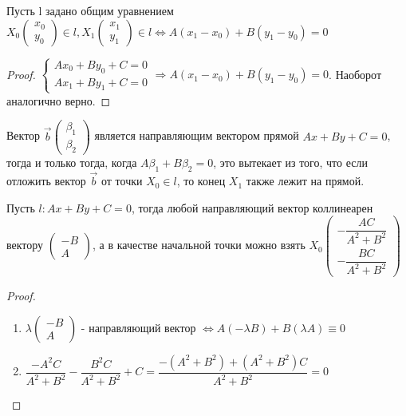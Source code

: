 \begin{proposition}
	Пусть l задано общим уравнением \(X_0\begin{pmatrix}
		x_0 \\ y_0
	\end{pmatrix} \in l, X_1\begin{pmatrix}
	x_1 \\ y_1
	\end{pmatrix} \in l\Longleftrightarrow A(x_1-x_0) + B(y_1-y_0) = 0\)
\end{proposition}
\begin{proof}
	\(\left\{
	\begin{gathered}
		Ax_0 + By_0+C = 0 \\
		Ax_1 + By_1 + C = 0
	\end{gathered}
	\right. \Longrightarrow A(x_1 - x_0) + B(y_1 - y_0 ) = 0\). Наоборот аналогично верно.
\end{proof}
\begin{corollary}
	Вектор \(\vec b\begin{pmatrix}
		\beta_1 \\ \beta_2
	\end{pmatrix}\) является направляющим вектором прямой \(Ax + By + C = 0\), тогда и только тогда, когда \(A\beta_1+B\beta_2 = 0\), это вытекает из того, что если отложить вектор $\vec{b}$ от точки \(X_0 \in l\), то конец \(X_1\) также лежит на прямой.
\end{corollary}
\begin{theorem}
	Пусть \(l: Ax+By+C = 0\), тогда любой направляющий вектор коллинеарен вектору \(\begin{pmatrix}
		-B \\ A
	\end{pmatrix}\), а в качестве начальной точки можно взять \(X_0\begin{pmatrix}
	-\dfrac{AC}{A^2+B^2} \\ -\dfrac{BC}{A^2+B^2}
	\end{pmatrix}\)
\end{theorem}
\begin{proof}
	\begin{enumerate}
		\item \(\lambda \begin{pmatrix}
			-B \\ A
		\end{pmatrix}\) - направляющий вектор \(\Longleftrightarrow A(-\lambda B)+B(\lambda A) \equiv 0\)
		\item \(\dfrac{-A^2C}{A^2+B^2} - \dfrac{B^2C}{A^2+B^2}+C = \dfrac{-(A^2+B^2) + (A^2+B^2)C}{A^2+B^2} = 0\)
	\end{enumerate}
\end{proof}
